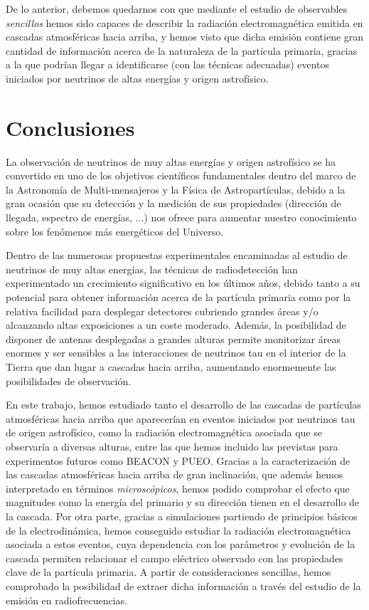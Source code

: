 \documentclass[11 pt, a4paper]{article} %
\numberwithin{equation}{section}
\numberwithin{figure}{section}
\numberwithin{table}{section}
\begin{document}
De lo anterior, debemos quedarnos con que mediante el estudio de observables \textit{sencillos} hemos sido capaces de describir la radiación electromagnética emitida en cascadas atmosféricas hacia arriba, y hemos visto que dicha emisión contiene gran cantidad de información acerca de la naturaleza de la partícula primaria, gracias a la que podrían llegar a identificarse (con las técnicas adecuadas) eventos iniciados por neutrinos de altas energías y origen astrofísico.
	\clearpage %
	\section{Conclusiones}
	La observación de neutrinos de muy altas energías y origen astrofísico se ha convertido en uno de los objetivos científicos fundamentales dentro del marco de la Astronomía de Multi-mensajeros y la Física de Astropartículas, debido a la gran ocasión que su detección y la medición de sus propiedades (dirección de llegada, espectro de energías, ...) nos ofrece para aumentar nuestro conocimiento sobre los fenómenos más energéticos del Universo.
	
	Dentro de las numerosas propuestas experimentales encaminadas al estudio de neutrinos de muy altas energías, las técnicas de radiodetección han experimentado un crecimiento significativo en los últimos años, debido tanto a su potencial para obtener información acerca de la partícula primaria como por la relativa facilidad para desplegar detectores cubriendo grandes áreas y/o alcanzando altas exposiciones a un coste moderado. Además, la posibilidad de disponer de antenas desplegadas a grandes alturas permite monitorizar áreas enormes y ser sensibles a las interacciones de neutrinos tau en el interior de la Tierra que dan lugar a cascadas hacia arriba, aumentando enormemente las posibilidades de observación.
	
	En este trabajo, hemos estudiado tanto el desarrollo de las cascadas de partículas atmosféricas hacia arriba que aparecerían en eventos iniciados por neutrinos tau de origen astrofísico, como la radiación electromagnética asociada que se observaría a diversas alturas, entre las que hemos incluido las previstas para experimentos futuros como BEACON y PUEO. Gracias a la caracterización de las cascadas atmosféricas hacia arriba de gran inclinación, que además hemos interpretado en términos \textit{microscópicos}, hemos podido comprobar el efecto que magnitudes como la energía del primario y su dirección tienen en el desarrollo de la cascada. Por otra parte, gracias a simulaciones partiendo de principios básicos de la electrodinámica, hemos conseguido estudiar la radiación electromagnética asociada a estos eventos, cuya dependencia con los parámetros y evolución de la cascada permiten relacionar el campo eléctrico observado con las propiedades clave de la partícula primaria. A partir de consideraciones sencillas, hemos comprobado la posibilidad de extraer dicha información a través del estudio de la emisión en radiofrecuencias.
	
\end{document}

